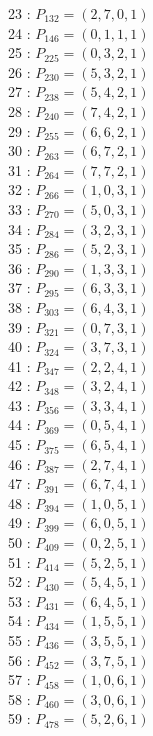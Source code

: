 \documentclass{article}
\begin{document}
{\begin{multicols}{3}
23 : $P_{132}=( 2, 7, 0, 1 )$\\
24 : $P_{146}=( 0, 1, 1, 1 )$\\
25 : $P_{225}=( 0, 3, 2, 1 )$\\
26 : $P_{230}=( 5, 3, 2, 1 )$\\
27 : $P_{238}=( 5, 4, 2, 1 )$\\
28 : $P_{240}=( 7, 4, 2, 1 )$\\
29 : $P_{255}=( 6, 6, 2, 1 )$\\
30 : $P_{263}=( 6, 7, 2, 1 )$\\
31 : $P_{264}=( 7, 7, 2, 1 )$\\
32 : $P_{266}=( 1, 0, 3, 1 )$\\
33 : $P_{270}=( 5, 0, 3, 1 )$\\
34 : $P_{284}=( 3, 2, 3, 1 )$\\
35 : $P_{286}=( 5, 2, 3, 1 )$\\
36 : $P_{290}=( 1, 3, 3, 1 )$\\
37 : $P_{295}=( 6, 3, 3, 1 )$\\
38 : $P_{303}=( 6, 4, 3, 1 )$\\
39 : $P_{321}=( 0, 7, 3, 1 )$\\
40 : $P_{324}=( 3, 7, 3, 1 )$\\
41 : $P_{347}=( 2, 2, 4, 1 )$\\
42 : $P_{348}=( 3, 2, 4, 1 )$\\
43 : $P_{356}=( 3, 3, 4, 1 )$\\
44 : $P_{369}=( 0, 5, 4, 1 )$\\
45 : $P_{375}=( 6, 5, 4, 1 )$\\
46 : $P_{387}=( 2, 7, 4, 1 )$\\
47 : $P_{391}=( 6, 7, 4, 1 )$\\
48 : $P_{394}=( 1, 0, 5, 1 )$\\
49 : $P_{399}=( 6, 0, 5, 1 )$\\
50 : $P_{409}=( 0, 2, 5, 1 )$\\
51 : $P_{414}=( 5, 2, 5, 1 )$\\
52 : $P_{430}=( 5, 4, 5, 1 )$\\
53 : $P_{431}=( 6, 4, 5, 1 )$\\
54 : $P_{434}=( 1, 5, 5, 1 )$\\
55 : $P_{436}=( 3, 5, 5, 1 )$\\
56 : $P_{452}=( 3, 7, 5, 1 )$\\
57 : $P_{458}=( 1, 0, 6, 1 )$\\
58 : $P_{460}=( 3, 0, 6, 1 )$\\
59 : $P_{478}=( 5, 2, 6, 1 )$\\

\end{multicols}}
\end{document}
